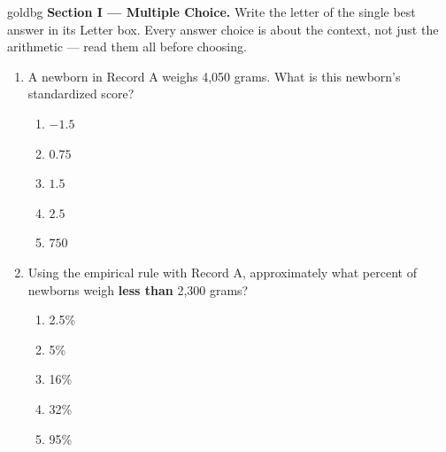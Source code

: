 \vspace{0.14in}

\boxguard[16]
\begin{headlinebox}{goldbg}
\small
\textbf{Section I --- Multiple Choice.} Write the letter of the single best answer in its Letter box. Every answer choice is
about the context, not just the arithmetic --- read them all before choosing.
\end{headlinebox}

\vspace{0.10in}

\begin{enumerate}[leftmargin=1.9em, itemsep=0.13in]

  \item A newborn in Record A weighs 4,050 grams. What is this newborn's standardized score?
        \begin{enumerate}[label=\textbf{(\Alph*)}, leftmargin=2.2em, itemsep=2pt]
          \item $-1.5$
          \item $0.75$
          \item $1.5$
          \item $2.5$
          \item $750$
                \hfill{}
        \end{enumerate}

  \item Using the empirical rule with Record A, approximately what percent of newborns weigh
        \textbf{less than} 2,300 grams?
        \begin{enumerate}[label=\textbf{(\Alph*)}, leftmargin=2.2em, itemsep=2pt]
          \item 2.5\%
          \item 5\%
          \item 16\%
          \item 32\%
          \item 95\%
                \hfill{}
        \end{enumerate}


\end{enumerate}
